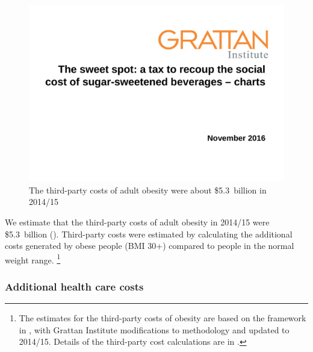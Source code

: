 \documentclass[embargoed]{grattan}
\begin{document}
\begin{figure}
\caption{The third-party costs of adult obesity were about \$5.3~billion in 2014/15}\label{fig:3rd-party-costs-adult-obesity-were-5bn}

\includegraphics[page=4]{atlas/ObesityCharts}


\end{figure}

We estimate that the third-party costs of adult obesity in 2014/15 were \$5.3~billion ().
Third-party costs were estimated by calculating the additional costs generated by obese people (BMI 30+) compared to people in the normal weight range.%
\footnote{The estimates for the third-party costs of obesity are based on the framework in \textcite{PwC2015Weighingcostobesity}, with Grattan Institute modifications to methodology and updated to 2014/15.
Details of the third-party cost calculations are in .}

\subsubsection{Additional health care costs}\label{additional-health-care-costs}
\end{document}

